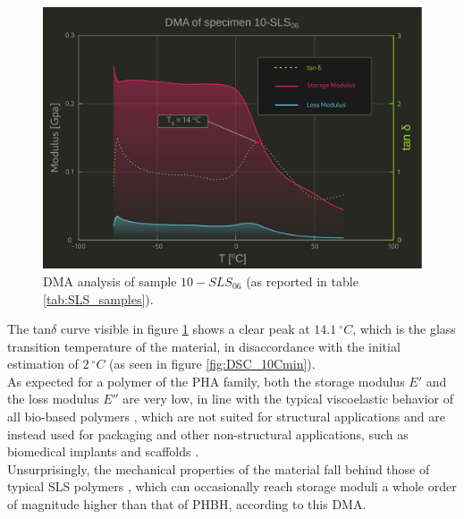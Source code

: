 \documentclass{article}
\begin{document}
            \begin{figure}[h!]
                \centering
                \includegraphics[width=\textwidth]{Pictures/Thermal_analysis_plots/DMA.pdf}
                \caption{DMA analysis of sample $10-SLS_{06}$ (as reported in table \ref{tab:SLS_samples}).}
                \label{fig:DMA_plot}
            \end{figure}

        \clearpage 

        The tan$\delta$ curve visible in figure \ref{fig:DMA_plot} shows a clear peak at $14.1 \ ^{\circ}C$, which is the glass transition temperature of the material, 
        in disaccordance with the initial estimation of $2 \ ^{\circ}C$ (as seen in figure \ref{fig:DSC_10Cmin}). \\ 

        As expected for a polymer of the PHA family, both the storage modulus $E'$ and the loss modulus $E''$ are very low, in line with the 
        typical viscoelastic behavior of all bio-based polymers \autocites{Kovalcik_PHA_Review}, which are not suited for structural applications and 
        are instead used for packaging and other non-structural applications, such as biomedical implants and scaffolds \autocites{Messori_Bondioli_PHAs}. \\

        Unsurprisingly, the mechanical properties of the material fall behind those of typical SLS polymers \autocites{Padovano_SLS_Review}, which can 
        occasionally reach storage moduli a whole order of magnitude higher than that of PHBH, according to this DMA. \\ 
\end{document}
